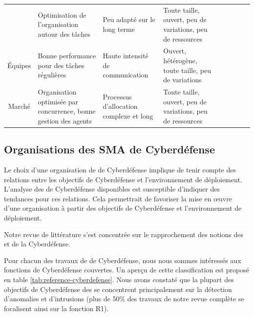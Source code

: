 \begin{table}[t!]
{\begin{tabularx}{\linewidth}
      { Coalition}
       & {  Optimisation de l'organisation autour des tâches}
       & {  Peu adapté sur le long terme}
       & {  Toute taille, ouvert, peu de variations, peu de ressources}
       & {  \cite{carvalho2011evolutionary}}
      \\

      { Équipes}
       & {  Bonne performance pour des tâches régulières}
       & {  Haute intensité de communication}
       & {  Ouvert, hétérogène, toute taille, peu de variations}
       & {  \cite{akandwanaho2018generic}}
      \\

      { Marché}
       & {  Organisation optimisée par concurrence, bonne gestion des agents}
       & {  Processus d'allocation complexe et long}
       & {  Toute taille, ouvert, peu de variations, peu de ressources}
       & {  \cite{demir2021adaptive}}
      \\
      \bottomrule
    \end{tabularx}
  }
  \label{tab:general-overview}
\end{table}


\subsection{Organisations des SMA de Cyberdéfense}


Le choix d'une organisation de  de Cyberdéfense implique de tenir compte des relations entre les objectifs de Cyberdéfense et l'environnement de déploiement.
L'analyse des  de Cyberdéfense disponibles est susceptible d'indiquer des tendances pour ces relations.
Cela permettrait de favoriser la mise en œuvre d'une organisation à partir des objectifs de Cyberdéfense et l'environnement de déploiement.

Notre revue de littérature s'est concentrée sur le rapprochement des notions des  et de la Cyberdéfense.

Pour chacun des travaux de  de Cyberdéfense, nous nous sommes intéressés aux fonctions de Cyberdéfense couvertes.
Un aperçu de cette classification est proposé en table \ref{tab:reference-cyberdefense}.
Nous avons constaté que la plupart des objectifs de Cyberdéfense des  se concentrent principalement sur la détection d'anomalies et d'intrusions (plus de 50\% des travaux de notre revue complète se focalisent ainsi sur la fonction R1).

